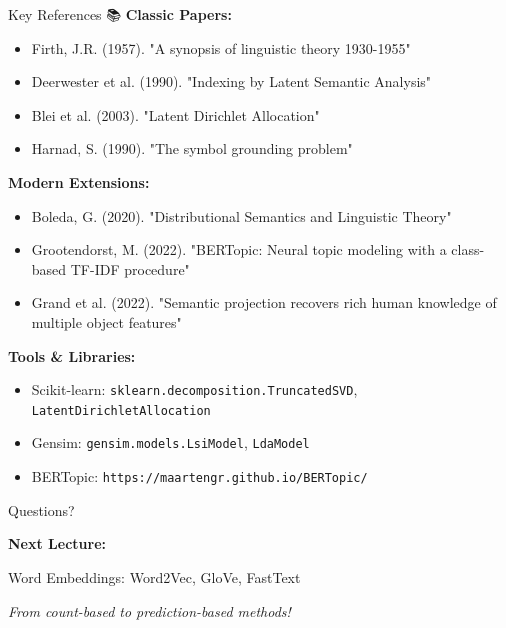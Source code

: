 \documentclass[aspectratio=169]{beamer}
\begin{document}
\begin{frame}[shrink=10]{Key References 📚}
\small
\textbf{Classic Papers:}
\begin{itemize}\setlength{\itemsep}{0pt}
    \item Firth, J.R. (1957). "A synopsis of linguistic theory 1930-1955"
    \item Deerwester et al. (1990). "Indexing by Latent Semantic Analysis"
    \item Blei et al. (2003). "Latent Dirichlet Allocation"
    \item Harnad, S. (1990). "The symbol grounding problem"
\end{itemize}

\vspace{0.5em}
\textbf{Modern Extensions:}
\begin{itemize}\setlength{\itemsep}{0pt}
    \item Boleda, G. (2020). "Distributional Semantics and Linguistic Theory"
    \item Grootendorst, M. (2022). "BERTopic: Neural topic modeling with a class-based TF-IDF procedure"
    \item Grand et al. (2022). "Semantic projection recovers rich human knowledge of multiple object features"
\end{itemize}

\vspace{0.5em}
\textbf{Tools \& Libraries:}
\begin{itemize}\setlength{\itemsep}{0pt}
    \item Scikit-learn: \texttt{sklearn.decomposition.TruncatedSVD}, \texttt{LatentDirichletAllocation}
    \item Gensim: \texttt{gensim.models.LsiModel}, \texttt{LdaModel}
    \item BERTopic: \texttt{https://maartengr.github.io/BERTopic/}
\end{itemize}
\end{frame}

\begin{frame}{Questions? 🙋}
\begin{center}
\LARGE
\textbf{Next Lecture:}

\vspace{1em}
Word Embeddings: Word2Vec, GloVe, FastText

\vspace{1em}
\textit{From count-based to prediction-based methods!}
\end{center}
\end{frame}
\end{document}
